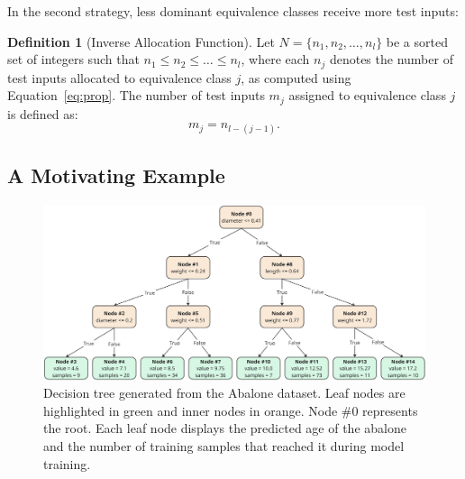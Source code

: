 \documentclass[
]{ceurart}
\theoremstyle{definition}
\newtheorem{definition}{Definition}[section]
\begin{document}
In the second strategy, less dominant equivalence classes receive more test inputs:
\begin{definition}[Inverse Allocation Function]
\label{def:inverse}
Let $N = \{n_1, n_2, \ldots, n_l\}$ be a sorted set of integers such that $n_1 \leq n_2 \leq \ldots \leq n_l$, where each $n_j$ denotes the number of test inputs allocated to equivalence class $j$, as computed using Equation~\eqref{eq:prop}. The number of test inputs $m_j$ assigned to equivalence class $j$ is defined as:
\begin{equation*}
m_j = n_{l - (j - 1)} .
\end{equation*}
\end{definition}

\subsection{A Motivating Example}

\begin{figure}
\centering
\includegraphics[width=\linewidth]{img/abalonetree}
\caption{Decision tree generated from the Abalone dataset. Leaf nodes are highlighted in green and inner nodes in orange. Node \#0 represents the root. Each leaf node displays the predicted age of the abalone and the number of training samples that reached it during model training.}
\label{fig:abalonetree}
\end{figure}
\end{document}

